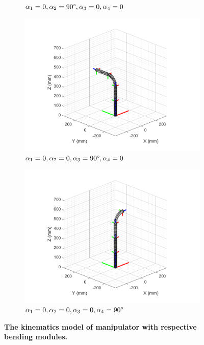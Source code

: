 \begin{figure}[H]
\begin{subfigure}{0.48\textwidth}
        \caption{$\alpha_1=0,\alpha_2=90 \degree,\alpha_3=0,\alpha_4=0$}
    \end{subfigure}
    \begin{subfigure}{0.48\textwidth} %
        \centering
        \includegraphics[width=\linewidth]{Image/MATLAB/manipulator_0_0_90_0.png}
        \caption{$\alpha_1=0,\alpha_2=0,\alpha_3=90 \degree,\alpha_4=0$}
    \end{subfigure}
    \hfill
    \begin{subfigure}{0.48\textwidth}
        \centering
        \includegraphics[width=\linewidth]{Image/MATLAB/manipulator_0_0_0_90.png}
        \caption{$\alpha_1=0,\alpha_2=0,\alpha_3=0,\alpha_4=90 \degree$}
    \end{subfigure}
    \caption[The kinematics model of manipulator with respective bending modules]
    {\centering \textbf{The kinematics model of manipulator with respective bending modules.}}
    \label{fig:kinematics_model_resp}
\end{figure}
